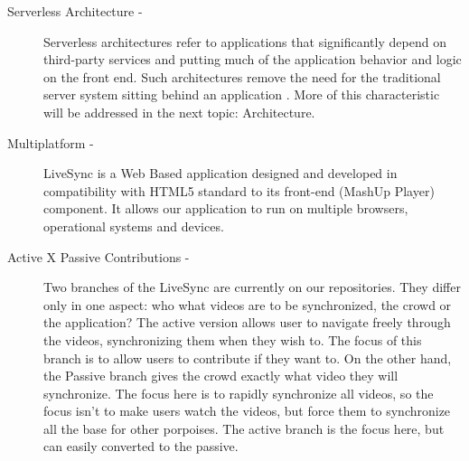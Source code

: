 \begin{description}
	\item[Serverless Architecture -] Serverless architectures refer to applications that significantly depend on third-party services and putting much of the application behavior and logic on the front end. Such architectures remove the need for the traditional server system sitting behind an application \cite{RobertServerless}. More of this characteristic will be addressed in the next topic: Architecture.
	
	\item[Multiplatform -] LiveSync is a Web Based application designed and developed in compatibility with HTML5 standard to its front-end (MashUp Player) component. It allows our application to run on multiple browsers, operational systems and devices.
	
	\item[Active X Passive Contributions -] Two branches of the LiveSync are currently on our repositories. They differ only in one aspect: who what videos are to be synchronized, the crowd or the application? The active version allows user to navigate freely through the videos, synchronizing them when they wish to. The focus of this branch is to allow users to contribute if they want to. On the other hand, the Passive branch gives the crowd exactly what video they will synchronize. The focus here is to rapidly synchronize all videos, so the focus isn't to make users watch the videos, but force them to synchronize all the base for other porpoises. The active branch is the focus here, but can easily converted to the passive.
	
\end{description}